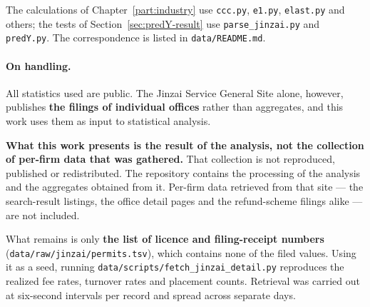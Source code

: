The calculations of Chapter~\ref{part:industry} use \texttt{ccc.py}, \texttt{e1.py},
\texttt{elast.py} and others; the tests of Section~\ref{sec:predY-result} use
\texttt{parse\_jinzai.py} and \texttt{predY.py}. The correspondence is listed in
\texttt{data/README.md}.

\paragraph{On handling.}
All statistics used are public. The Jinzai Service General Site alone, however, publishes
\textbf{the filings of individual offices} rather than aggregates, and this work uses them as
input to statistical analysis.

\textbf{What this work presents is the result of the analysis, not the collection of per-firm data
that was gathered.} That collection is not reproduced, published or redistributed. The repository
contains the processing of the analysis and the aggregates obtained from it. Per-firm data
retrieved from that site — the search-result listings, the office detail pages and the
refund-scheme filings alike — are not included.

What remains is only \textbf{the list of licence and filing-receipt numbers}
(\texttt{data/raw/jinzai/permits.tsv}), which contains none of the filed values. Using it as a
seed, running \texttt{data/scripts/fetch\_jinzai\_detail.py} reproduces the realized fee rates,
turnover rates and placement counts. Retrieval was carried out at six-second intervals per record
and spread across separate days.

